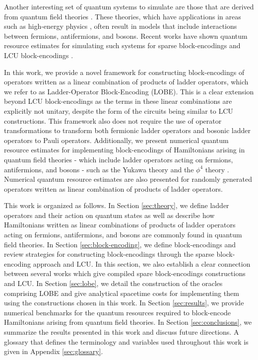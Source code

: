 Another interesting set of quantum systems to simulate are those that are derived from quantum field theories \cite{Peskin:1995ev, jordan2012quantum} .
These theories, which have applications in areas such as high-energy physics \cite{bauer2023quantum}, often result in models that include interactions between fermions, antifermions, and bosons.
Recent works have shown quantum resource estimates for simulating such systems for sparse block-encodings \cite{camps2024explicit, liu2024efficient} and LCU block-encodings \cite{rhodes2024exponential}.

In this work, we provide a novel framework for constructing block-encodings of operators written as a linear combination of products of ladder operators, which we refer to as Ladder-Operator Block-Encoding (LOBE).
This is a clear extension beyond LCU block-encodings as the terms in these linear combinations are explicitly not unitary, despite the form of the circuits being similar to LCU constructions.
This framework also does not require the use of operator transformations to transform both fermionic ladder operators \cite{jordan1928paulische, bravyi2002fermionic,seeley2012bravyi} and bosonic ladder operators \cite{somma2005quantum} to Pauli operators.
Additionally, we present numerical quantum resource estimates for implementing block-encodings of Hamiltonians arising in quantum field theories - which include ladder operators acting on fermions, antifermions, and bosons - such as the Yukawa theory \cite{Peskin:1995ev} and the $\phi^4$ theory \cite{}.
Numerical quantum resource estimates are also presented for randomly generated operators written as linear combination of products of ladder operators.

This work is organized as follows.
In Section \ref{sec:theory}, we define ladder operators and their action on quantum states as well as describe how Hamiltonians written as linear combinations of products of ladder operators acting on fermions, antifermions, and bosons are commonly found in quantum field theories.
In Section \ref{sec:block-encoding}, we define block-encodings and review strategies for constructing block-encodings through the sparse block-encoding approach and LCU.
In this section, we also establish a clear connection between several works which give compiled spare block-encodings constructions \cite{camps2024explicit,liu2024efficient} and LCU.
In Section \ref{sec:lobe}, we detail the construction of the oracles comprising LOBE and give analytical spacetime costs for implementing them using the constructions chosen in this work.
In Section \ref{sec:results}, we provide numerical benchmarks for the quantum resources required to block-encode Hamiltonians arising from quantum field theories. 
In Section \ref{sec:conclusions}, we summarize the results presented in this work and discuss future directions.
A glossary that defines the terminology and variables used throughout this work is given in Appendix \ref{sec:glossary}.
